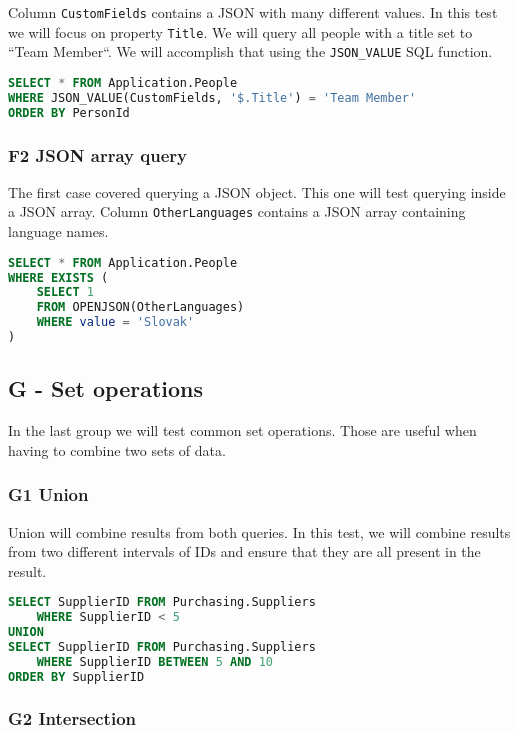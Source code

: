 Column \texttt{CustomFields} contains a JSON with many different values. In this test we will focus on property \texttt{Title}. We will query all people with a title set to ``Team Member``.
We will accomplish that using the \texttt{JSON\_VALUE} SQL function.

\begin{lstlisting}[language=SQL]
SELECT * FROM Application.People
WHERE JSON_VALUE(CustomFields, '$.Title') = 'Team Member'
ORDER BY PersonId
\end{lstlisting}

\subsubsection*{F2 JSON array query} \label{query:f2}

The first case covered querying a JSON object. This one will test querying inside a JSON array. Column \texttt{OtherLanguages} contains a JSON array containing language names.

\begin{lstlisting}[language=SQL]
SELECT * FROM Application.People
WHERE EXISTS (
    SELECT 1
    FROM OPENJSON(OtherLanguages)
    WHERE value = 'Slovak'
)
\end{lstlisting}

\subsection{G - Set operations}

In the last group we will test common set operations. Those are useful when having to combine two sets of data.

\subsubsection*{G1 Union} \label{query:g1}

Union will combine results from both queries. In this test, we will combine results from two different intervals of IDs and ensure that they are all present in the result.

\begin{lstlisting}[language=SQL]
SELECT SupplierID FROM Purchasing.Suppliers 
    WHERE SupplierID < 5
UNION
SELECT SupplierID FROM Purchasing.Suppliers 
    WHERE SupplierID BETWEEN 5 AND 10
ORDER BY SupplierID
\end{lstlisting}

\subsubsection*{G2 Intersection} \label{query:g2}

